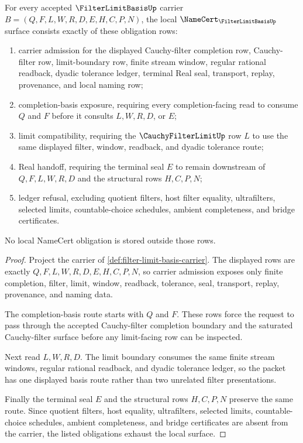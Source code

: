 \begin{theorem}
\label{thm:filter-limit-basis-namecert-obligations}
For every accepted $\FilterLimitBasisUp$ carrier $B=(Q,F,L,W,R,D,E,H,C,P,N)$, the local $\NameCert_{\FilterLimitBasisUp}$ surface consists exactly of these obligation rows:
\begin{enumerate}
\item carrier admission for the displayed Cauchy-filter completion row, Cauchy-filter row, limit-boundary row, finite stream window, regular rational readback, dyadic tolerance ledger, terminal Real seal, transport, replay, provenance, and local naming row;
\item completion-basis exposure, requiring every completion-facing read to consume $Q$ and $F$ before it consults $L,W,R,D$, or $E$;
\item limit compatibility, requiring the $\CauchyFilterLimitUp$ row $L$ to use the same displayed filter, window, readback, and dyadic tolerance route;
\item Real handoff, requiring the terminal seal $E$ to remain downstream of $Q,F,L,W,R,D$ and the structural rows $H,C,P,N$;
\item ledger refusal, excluding quotient filters, host filter equality, ultrafilters, selected limits, countable-choice schedules, ambient completeness, and bridge certificates.
\end{enumerate}
No local NameCert obligation is stored outside those rows.
\end{theorem}
\begin{proof}
Project the carrier of \autoref{def:filter-limit-basis-carrier}. The displayed rows are exactly $Q,F,L,W,R,D,E,H,C,P,N$, so carrier admission exposes only finite completion, filter, limit, window, readback, tolerance, seal, transport, replay, provenance, and naming data.

The completion-basis route starts with $Q$ and $F$. These rows force the request to pass through the accepted Cauchy-filter completion boundary and the saturated Cauchy-filter surface before any limit-facing row can be inspected.

Next read $L,W,R,D$. The limit boundary consumes the same finite stream windows, regular rational readback, and dyadic tolerance ledger, so the packet has one displayed basis route rather than two unrelated filter presentations.

Finally the terminal seal $E$ and the structural rows $H,C,P,N$ preserve the same route. Since quotient filters, host equality, ultrafilters, selected limits, countable-choice schedules, ambient completeness, and bridge certificates are absent from the carrier, the listed obligations exhaust the local surface.
\end{proof}

